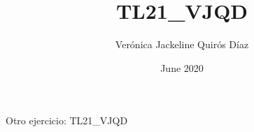 \documentclass[12pt, twocolumns]{article}
\title{TL21\_VJQD}
\author{Verónica Jackeline Quirós Díaz}
\date{June 2020}
\begin{document}
\maketitle
Otro ejercicio: TL21\_VJQD
\end{document}
